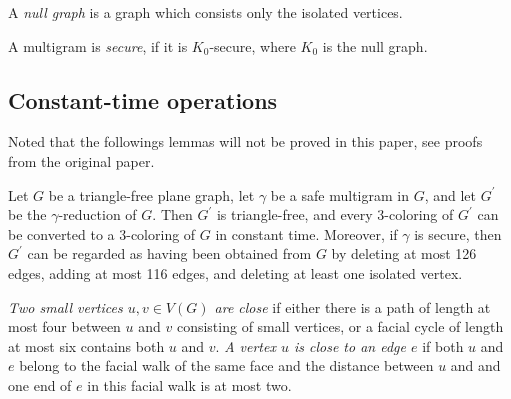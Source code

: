 \begin{definition}
A \textit{null graph} is a graph which consists only the isolated vertices. \cite{null}
\end{definition}

\begin{definition}
A multigram is \textit{secure}, if it is $K_0$-secure, where $K_0$ is the null graph. \cite{dvorak2013threecoloring}
\end{definition}

\subsection{Constant-time operations}
Noted that the followings lemmas will not be proved in this paper, see proofs from the original paper.\cite{dvorak2013threecoloring}
\begin{lemma}
Let $G$ be a triangle-free plane graph, let $\gamma$ be a safe multigram in $G$, and let $G^{'}$ be the $\gamma$-reduction of $G$. Then $G^{'}$ is triangle-free, and every 3-coloring of $G^{'}$ can be converted to a 3-coloring of $G$ in constant time. Moreover, if $\gamma$ is secure, then $G^{'}$ can be regarded as having been obtained from $G$ by deleting at most 126 edges, adding at most 116 edges, and deleting at least one isolated vertex.\cite{dvorak2013threecoloring}
\end{lemma}

\begin{definition}
\textit{Two small vertices $u, v \in V(G)$ are close} if either there is a path of length at most four between $u$ and $v$ consisting of small vertices, or a facial cycle of length at most six contains both $u$ and $v$. \textit{A vertex $u$ is close to an edge $e$} if both $u$ and $e$ belong to the facial walk of the same face and the distance between $u$ and and one end of $e$ in this facial walk is at most two. \cite{dvorak2013threecoloring}
\end{definition}

